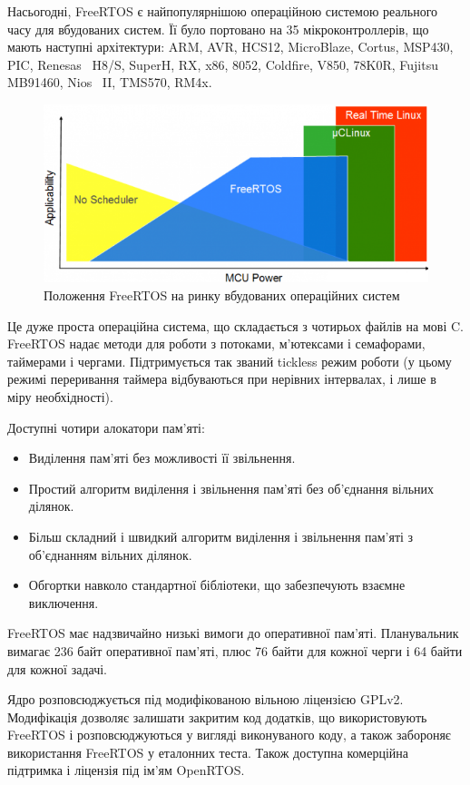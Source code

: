 \documentclass[oneside,14pt,a4paper,final]{myextreport}
\begin{document}
Насьогодні, FreeRTOS\cite{freertos} є найпопулярнішою операційною системою реального часу для вбудованих систем\cite{freertos:popular}. Її було портовано на 35 мікроконтроллерів, що мають наступні архітектури: ARM, AVR, HCS12, MicroBlaze, Cortus, MSP430, PIC, Renesas~ H8/S, SuperH, RX, x86, 8052, Coldfire, V850, 78K0R, Fujitsu MB91460, Nios~ II, TMS570, RM4x.

\begin{figure}[h]
  \includegraphics[width=\textwidth]{freertos-market-position}
  \caption{Положення FreeRTOS на ринку вбудованих операційних систем}
\end{figure}

Це дуже проста операційна система, що складається з чотирьох файлів на мові C. FreeRTOS надає методи для роботи з потоками, м'ютексами і семафорами, таймерами і чергами. Підтримується так званий tickless режим роботи (у цьому режимі переривання таймера відбуваються при нерівних інтервалах, і лише в міру необхідності).

Доступні чотири алокатори пам'яті:
\begin{itemize}
  \item Виділення пам'яті без можливості її звільнення.
  \item Простий алгоритм виділення і звільнення пам'яті без об'єднання вільних ділянок.
  \item Більш складний і швидкий алгоритм виділення і звільнення пам'яті з об'єднанням вільних ділянок.
  \item Обгортки навколо стандартної бібліотеки, що забезпечують взаємне виключення.
\end{itemize}

FreeRTOS має надзвичайно низькі вимоги до оперативної пам'яті. Планувальник вимагає 236 байт оперативної пам'яті, плюс 76 байти для кожної черги і 64 байти для кожної задачі.

Ядро розповсюджується під модифікованою вільною ліцензією GPLv2\cite{freertos:license}. Модифікація дозволяє залишати закритим код додатків, що використовують FreeRTOS і розповсюджуються у вигляді виконуваного коду, а також забороняє використання FreeRTOS у еталонних теста. Також доступна комерційна підтримка і ліцензія під ім'ям OpenRTOS\cite{openrtos}.
\end{document}

